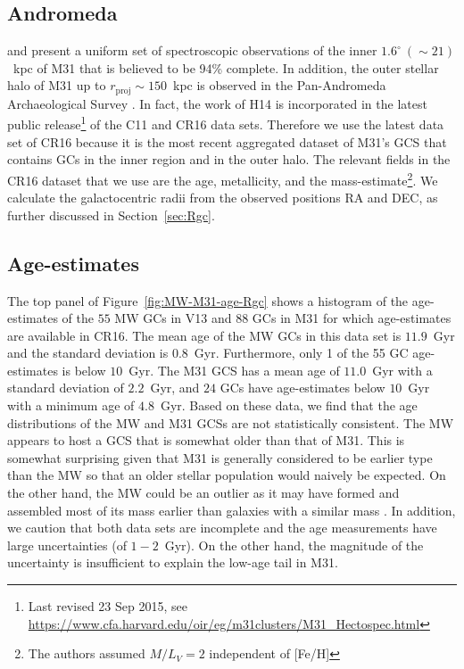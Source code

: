 \documentclass[a4paper,fleqn,usenatbib]{mnras}
\begin{document}
\subsection{Andromeda}
\label{sec:andromeda}
\citet[][hereafter C11]{2011AJ....141...61C} and \citet[][hereafter CR16]{2016ApJ...824...42C}
present a uniform set of spectroscopic observations of the inner 
$1.6^\circ~({\sim}21)$~kpc of M31 that is believed to be 94\% complete. In addition,
the outer stellar halo of M31 up to $r_{\text{proj}}\sim150$~kpc is observed in 
the Pan-Andromeda Archaeological Survey \citep[PAndAS, ][hereafter H14]{2014MNRAS.442.2165H,
2014MNRAS.442.2929V, 2019MNRAS.484.1756M}. In fact, 
the work of H14 is incorporated in the latest public release\footnote{Last 
revised 23 Sep 2015, see \url{https://www.cfa.harvard.edu/oir/eg/m31clusters/M31_Hectospec.html}}
of the C11 and CR16 data sets. Therefore we use the latest data set of CR16 
because it is the most recent aggregated dataset of M31's GCS that contains GCs 
in the inner region and in the outer halo. The relevant fields in the CR16 dataset 
that we use are the age, metallicity, and the mass-estimate\footnote{The authors 
assumed $M/L_V = 2$ independent of [Fe/H]}. We calculate the galactocentric radii 
from the observed positions RA and DEC, as further discussed in Section~\ref{sec:Rgc}.

\subsection{Age-estimates}
\label{sec:age}
The top panel of Figure~\ref{fig:MW-M31-age-Rgc} shows a histogram of the age-estimates
of the $55$ MW GCs in V13 and $88$ GCs in M31 for which age-estimates are available
in CR16. The mean age of the MW GCs in this data set is $11.9$~Gyr and the 
standard deviation is $0.8$~Gyr. Furthermore, only 1 of the 55 GC age-estimates is
below $10$~Gyr. The M31 GCS has a mean age of $11.0$~Gyr with a standard deviation 
of $2.2$~Gyr, and $24$ GCs have age-estimates below $10$~Gyr with a minimum age 
of $4.8$~Gyr. Based on these data, we find that the age distributions of the MW 
and M31 GCSs are not statistically consistent. The MW appears 
to host a GCS that is somewhat older than that of M31.
This is somewhat surprising given that M31 is generally considered to be earlier
type than the MW so that an older stellar population would naively be expected.
On the other hand, the MW could be an outlier as it may have formed and assembled 
most of its mass earlier than galaxies with a similar mass \citep[e.g.][]{2014ApJ...781L..31S,
2015A&A...578A..87S,2018MNRAS.477.5072M}.
In addition, we caution that both data sets are incomplete and the age 
measurements have large uncertainties (of $1-2$~Gyr). On the other hand, the 
magnitude of the uncertainty is insufficient to explain the low-age tail in M31.
\end{document}
